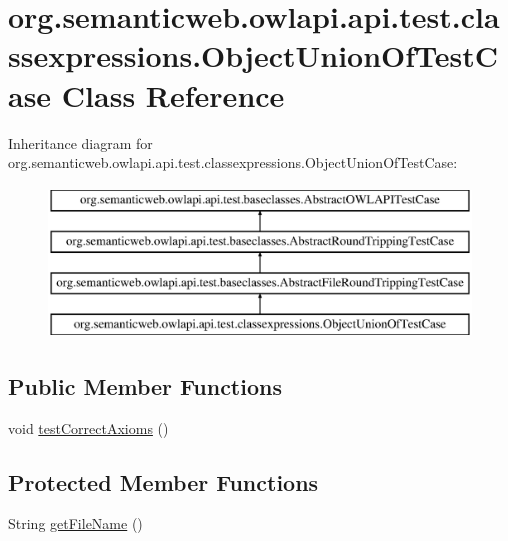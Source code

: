 \hypertarget{classorg_1_1semanticweb_1_1owlapi_1_1api_1_1test_1_1classexpressions_1_1_object_union_of_test_case}{\section{org.\-semanticweb.\-owlapi.\-api.\-test.\-classexpressions.\-Object\-Union\-Of\-Test\-Case Class Reference}
\label{classorg_1_1semanticweb_1_1owlapi_1_1api_1_1test_1_1classexpressions_1_1_object_union_of_test_case}
}
Inheritance diagram for org.\-semanticweb.\-owlapi.\-api.\-test.\-classexpressions.\-Object\-Union\-Of\-Test\-Case\-:\begin{figure}[H]
\begin{center}
\leavevmode
\includegraphics[height=4.000000cm]{classorg_1_1semanticweb_1_1owlapi_1_1api_1_1test_1_1classexpressions_1_1_object_union_of_test_case}
\end{center}
\end{figure}
\subsection*{Public Member Functions}
\begin{DoxyCompactItemize}
\item 
void \hyperlink{classorg_1_1semanticweb_1_1owlapi_1_1api_1_1test_1_1classexpressions_1_1_object_union_of_test_case_a4fea68fc16a481e222c88a9b717e8905}{test\-Correct\-Axioms} ()
\end{DoxyCompactItemize}
\subsection*{Protected Member Functions}
\begin{DoxyCompactItemize}
\item 
String \hyperlink{classorg_1_1semanticweb_1_1owlapi_1_1api_1_1test_1_1classexpressions_1_1_object_union_of_test_case_abb7e8d1807fbd30a23c91e371925aeb9}{get\-File\-Name} ()
\end{DoxyCompactItemize}


